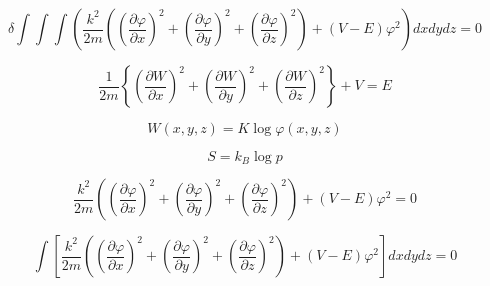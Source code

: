 $$
\delta \int\int\int\left(\frac{k^2}{2m}\left(\left(\frac{\partial \varphi}{\partial x}\right)^2+\left(\frac{\partial \varphi}{\partial y}\right)^2+\left(\frac{\partial \varphi}{\partial z}\right)^2\right)+(V-E)\varphi^2\right)dxdydz=0
$$

$$
\frac{1}{2m}\left\{\left(\frac{\partial W}{\partial x}\right)^2+\left(\frac{\partial W}{\partial y}\right)^2+\left(\frac{\partial W}{\partial z}\right)^2\right\}+V=E
$$

$$
W(x,y,z)=K\log\varphi(x,y,z)
$$

$$
S=k_B\log p
$$

$$
\frac{k^2}{2m}\left(\left(\frac{\partial \varphi}{\partial x}\right)^2+\left(\frac{\partial \varphi}{\partial y}\right)^2+\left(\frac{\partial \varphi}{\partial z}\right)^2\right)+(V-E)\varphi^2=0
$$

$$
\int\left[\frac{k^2}{2m}\left(\left(\frac{\partial \varphi}{\partial x}\right)^2+\left(\frac{\partial \varphi}{\partial y}\right)^2+\left(\frac{\partial \varphi}{\partial z}\right)^2\right)+(V-E)\varphi^2 \right]dxdydz=0
$$
